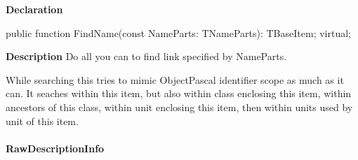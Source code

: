 \documentclass{report}
\newif\ifpdf
\begin{document}
\label{PasDoc_Items.TBaseItem-FindName}
\begin{list}{}{
\setlength{\itemindent}{0cm}
\setlength{\listparindent}{0cm}
\setlength{\leftmargin}{\evensidemargin}
\addtolength{\leftmargin}{\tmplength}
\settowidth{\labelsep}{X}
\addtolength{\leftmargin}{\labelsep}
\setlength{\labelwidth}{\tmplength}
}
\item[\textbf{Declaration}\hfill]
\ifpdf
\begin{flushleft}
\fi
\begin{ttfamily}
public function FindName(const NameParts: TNameParts): TBaseItem; virtual;\end{ttfamily}

\ifpdf
\end{flushleft}
\fi

\par
\item[\textbf{Description}]
Do all you can to find link specified by NameParts.

While searching this tries to mimic ObjectPascal identifier scope as much as it can. It seaches within this item, but also within class enclosing this item, within ancestors of this class, within unit enclosing this item, then within units used by unit of this item.

\end{list}
\paragraph*{RawDescriptionInfo}\hspace*{\fill}
\end{document}

